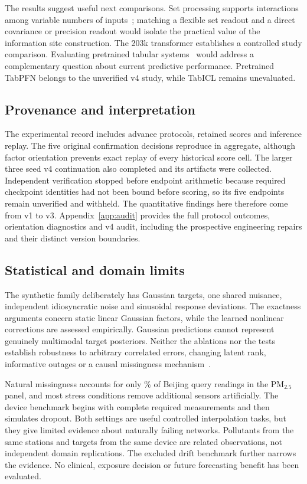 The results suggest useful next comparisons. Set processing supports interactions among variable numbers of inputs~\citep{zaheer2017deepsets,lee2019settransformer}; matching a flexible set readout and a direct covariance or precision readout would isolate the practical value of the information site construction. The 203k transformer establishes a controlled study comparison. Evaluating pretrained tabular systems~\citep{hollmann2025tabpfnv2,qu2025tabicl} would address a complementary question about current predictive performance. Pretrained TabPFN belongs to the unverified v4 study, while TabICL remains unevaluated.

\subsection{Provenance and interpretation}

The experimental record includes advance protocols, retained scores and inference replay. The five original confirmation decisions reproduce in aggregate, although factor orientation prevents exact replay of every historical score cell. The larger three seed v4 continuation also completed and its artifacts were collected. Independent verification stopped before endpoint arithmetic because required checkpoint identities had not been bound before scoring, so its five endpoints remain unverified and withheld. The quantitative findings here therefore come from v1 to v3. Appendix~\ref{app:audit} provides the full protocol outcomes, orientation diagnostics and v4 audit, including the prospective engineering repairs and their distinct version boundaries.

\subsection{Statistical and domain limits}

The synthetic family deliberately has Gaussian targets, one shared nuisance, independent idiosyncratic noise and sinusoidal response deviations. The exactness arguments concern static linear Gaussian factors, while the learned nonlinear corrections are assessed empirically. Gaussian predictions cannot represent genuinely multimodal target posteriors. Neither the ablations nor the tests establish robustness to arbitrary correlated errors, changing latent rank, informative outages or a causal missingness mechanism~\citep{rubin1976inference,little2019statistical}.

Natural missingness accounts for only \Rbeijingnatmiss\% of Beijing query readings in the PM$_{2.5}$ panel, and most stress conditions remove additional sensors artificially. The device benchmark begins with complete required measurements and then simulates dropout. Both settings are useful controlled interpolation tasks, but they give limited evidence about naturally failing networks. Pollutants from the same stations and targets from the same device are related observations, not independent domain replications. The excluded drift benchmark further narrows the evidence. No clinical, exposure decision or future forecasting benefit has been evaluated.


